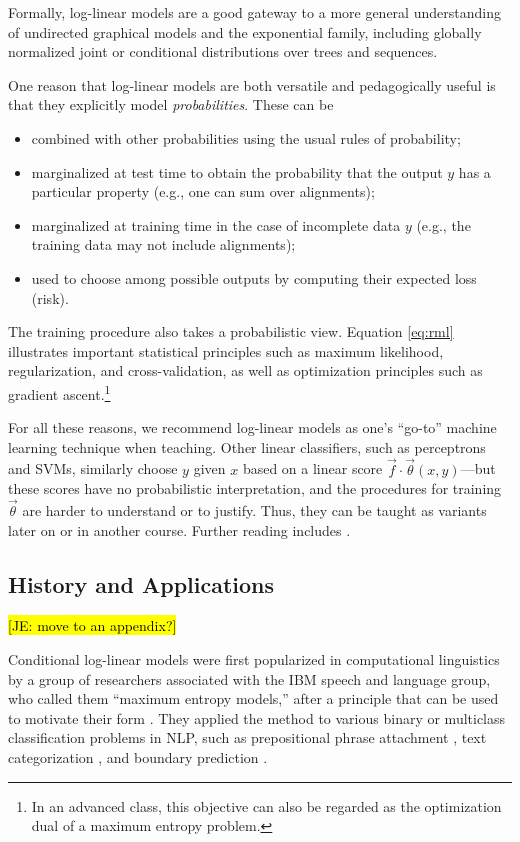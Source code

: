 \documentclass[11pt,letterpaper]{article}
\newcommand{\Note}[1]{}
\renewcommand{\Note}[1]{\hl{[#1]}}
\newcommand{\NoteSigned}[3]{{\sethlcolor{#2}\Note{#1: #3}}}
\newcommand{\NoteJE}[1]{\NoteSigned{JE}{LightGreen}{#1}}
\begin{document}
Formally, log-linear models are a good gateway to a more general
understanding of undirected graphical models and the exponential
family, including globally normalized joint or conditional
distributions over trees and sequences.

One reason that log-linear models are both versatile and pedagogically
useful is that they explicitly model {\em probabilities}.  These can be 
\begin{itemize}
\item combined with other probabilities using the usual rules of probability;
\item marginalized at test time to obtain the probability that the output 
  $y$ has a particular property (e.g., one can sum over alignments);
\item marginalized at training time in the case of incomplete data $y$
  (e.g., the training data may not include alignments);
\item used to choose among possible outputs by computing their 
  expected loss (risk).
\end{itemize}
The training procedure also takes a probabilistic view.  Equation
\eqref{eq:rml} illustrates important statistical principles such as maximum
likelihood, regularization, and cross-validation, as well as
optimization principles such as gradient ascent.\footnote{In an
  advanced class, this objective can also be regarded as the
  optimization dual of a maximum entropy problem.}

For all these reasons, we recommend log-linear models as one's
``go-to'' machine learning technique when teaching.  Other linear
classifiers, such as perceptrons and SVMs, similarly choose $y$ given
$x$ based on a linear score $\vec{f} \cdot \vec{\theta}(x,y)$---but
these scores have no probabilistic interpretation, and the procedures
for training $\vec{\theta}$ are harder to understand or to justify.
Thus, they can be taught as variants later on or in another course.
Further reading includes \cite{smith-2011}.

\subsection{History and Applications}

\NoteJE{move to an appendix?}

Conditional log-linear models were first popularized in computational
linguistics by a group of researchers associated with the IBM speech
and language group, who called them ``maximum entropy models,'' after
a principle that can be used to motivate their form
\cite{jaynes-1957}.  They applied the method to various binary or
multiclass classification problems in NLP, such as prepositional
phrase attachment \cite{ratnaparkhi-1994}, text categorization
\cite{nigam-lafferty-mccallum-1999}, and boundary prediction
\cite{beeferman-berger-lafferty-1999}.
\end{document}
